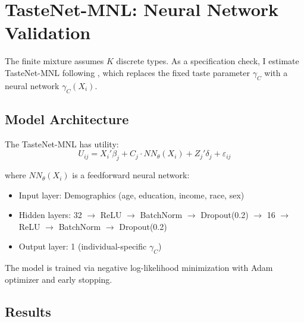 \documentclass[12pt]{article}
\begin{document}
\section{TasteNet-MNL: Neural Network Validation}
\label{app:tastenet}

The finite mixture assumes $K$ discrete types. As a specification check, I estimate TasteNet-MNL following \citet{han2022}, which replaces the fixed taste parameter $\gamma_C$ with a neural network $\gamma_C(X_i)$.

\subsection{Model Architecture}

The TasteNet-MNL has utility:
\begin{equation}
U_{ij} = X_i'\beta_j + C_j \cdot NN_\theta(X_i) + Z_j'\delta_j + \varepsilon_{ij}
\end{equation}

where $NN_\theta(X_i)$ is a feedforward neural network:
\begin{itemize}
    \item Input layer: Demographics (age, education, income, race, sex)
    \item Hidden layers: 32 $\rightarrow$ ReLU $\rightarrow$ BatchNorm $\rightarrow$ Dropout(0.2) $\rightarrow$ 16 $\rightarrow$ ReLU $\rightarrow$ BatchNorm $\rightarrow$ Dropout(0.2)
    \item Output layer: 1 (individual-specific $\gamma_C$)
\end{itemize}

The model is trained via negative log-likelihood minimization with Adam optimizer and early stopping.

\subsection{Results}
\end{document}
